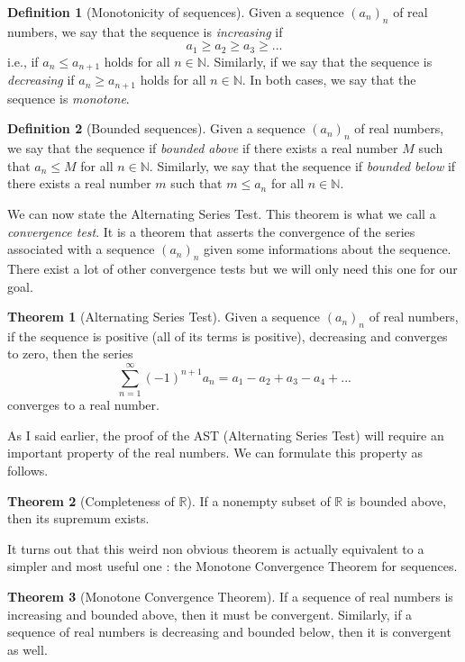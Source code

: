 \documentclass[10pt]{article}
\newcommand{\R}{\mathbb{R}}
\newcommand{\N}{\mathbb{N}}
\theoremstyle{definition}
\newtheorem*{definition}{Definition}
\newtheorem*{theorem}{Theorem}
\begin{document}
\begin{definition}[Monotonicity of sequences]
    Given a sequence $(a_n)_n$ of real numbers, we say that the sequence is \textit{increasing} if
    $$a_1 \geq a_2 \geq a_3 \geq ... $$
    i.e., if $a_n \leq a_{n+1}$ holds for all $n \in \N$. Similarly, if we say that the sequence is \textit{decreasing} if $a_n \geq a_{n+1}$ holds for all $n \in \N$. In both cases, we say that the sequence is \textit{monotone}.
\end{definition}

\begin{definition}[Bounded sequences]
    Given a sequence $(a_n)_n$ of real numbers, we say that the sequence if \textit{bounded above} if there exists a real number $M$ such that $a_n \leq M$ for all $n \in \N$. Similarly, we say that the sequence if \textit{bounded below} if there exists a real number $m$ such that $m \leq a_n$ for all $n \in \N$.
\end{definition}

We can now state the Alternating Series Test. This theorem is what we call a \textit{convergence test}. It is a theorem that asserts the convergence of the series associated with a sequence $(a_n)_n$ given some informations about the sequence. There exist a lot of other convergence tests but we will only need this one for our goal.

\begin{theorem}[Alternating Series Test]
    Given a sequence $(a_n)_n$ of real numbers, if the sequence is positive (all of its terms is positive), decreasing and converges to zero, then the series
    $$\sum_{n=1}^{\infty}(-1)^{n+1}a_n = a_1 - a_2 + a_3 - a_4 + ... $$
    converges to a real number.
\end{theorem}

As I said earlier, the proof of the AST (Alternating Series Test) will require an important property of the real numbers. We can formulate this property as follows.

\begin{theorem}[Completeness of $\R$]
    If a nonempty subset of $\R$ is bounded above, then its supremum exists.
\end{theorem}

It turns out that this weird non obvious theorem is actually equivalent to a simpler and most useful one : the Monotone Convergence Theorem for sequences.

\begin{theorem}[Monotone Convergence Theorem]
    If a sequence of real numbers is increasing and bounded above, then it must be convergent. Similarly, if a sequence of real numbers is decreasing and bounded below, then it is convergent as well.
\end{theorem}
\end{document}
